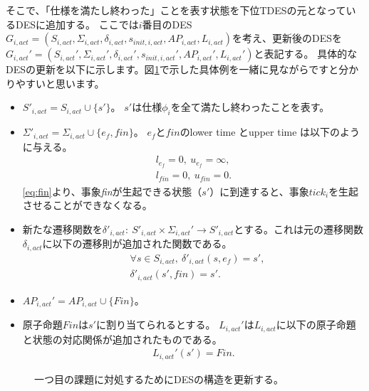 \documentclass[ 10pt]{jsarticle}
\newcommand{\req}[1]{\eqref{#1}}
\begin{document}
そこで、「仕様を満たし終わった」ことを表す状態を下位TDESの元となっているDESに追加する。
ここでは$i$番目のDES $G_{i,\textit{act}}=(S_{i,\textit{act}},\Sigma_{i,\textit{act}},\delta_{i,\textit{act}},s_{\textit{init},i,\textit{act}},\textit{AP}_{i,\textit{act}},L_{i,\textit{act}})$を考え、更新後のDESを$G_{i,\textit{act}}'=(S_{i,\textit{act}}',\Sigma_{i,\textit{act}}',\delta_{i,\textit{act}}',s_{\textit{init},i,\textit{act}}',\textit{AP}_{i,\textit{act}}',L_{i,\textit{act}}')$と表記する。
具体的なDESの更新を以下に示します。図\ref{c}で示した具体例を一緒に見ながらですと分かりやすいと思います。
%
\begin{itemize}
\item
$S'_{i,\textit{act}}=S_{i,\textit{act}}\cup\{s'\}$。
$s'$は仕様$\phi_i$を全て満たし終わったことを表す。
\item
$\Sigma'_{i,\textit{act}}=\Sigma_{i,\textit{act}}\cup\{e_f,\textit{fin}\}$。
$e_f$と$\textit{fin}$のlower time とupper time は以下のように与える。
\begin{align}
l_{e_f}=0,\ u_{e_f}=\infty,\\
l_{\textit{fin}}=0,\ u_{\textit{fin}}=0.\label{eq:fin}
\end{align}
\req{eq:fin}より、事象\textit{fin}が生起できる状態（$s'$）に到達すると、事象$\textit{tick}_i$を生起させることができなくなる。
\item
新たな遷移関数を$\delta'_{i,act}:~S'_{i,\textit{act}}\times \Sigma_{i,\textit{act}}'\to S'_{i,\textit{act}}$とする。これは元の遷移関数$\delta_{i,act}$に以下の遷移則が追加された関数である。
\begin{align}
&\forall s\in S_{i,\textit{act}}, ~\delta'_{i,act}(s,e_f)=s',\\
&\delta'_{i,act}(s',\textit{fin})=s'.\label{delta:fin}
\end{align}
\item
$\textit{AP}_{i,\textit{act}}'=\textit{AP}_{i,\textit{act}}\cup\{\textit{Fin}\}$。
\item
原子命題$\textit{Fin}$は$s'$に割り当てられるとする。
$L_{i,\textit{act}}'$は$L_{i,\textit{act}}$に以下の原子命題と状態の対応関係が追加されたものである。
\begin{align}
L_{i,\textit{act}}'(s')=\textit{Fin}.
\end{align}
%
\end{itemize}
%
\begin{figure}[hbt]
\begin{center}
\hspace{0.3cm}
%
%
\hspace{0cm}
%
%
\caption{一つ目の課題に対処するためにDESの構造を更新する。} 
\label{c}
\end{center}
\end{figure}
\end{document}

